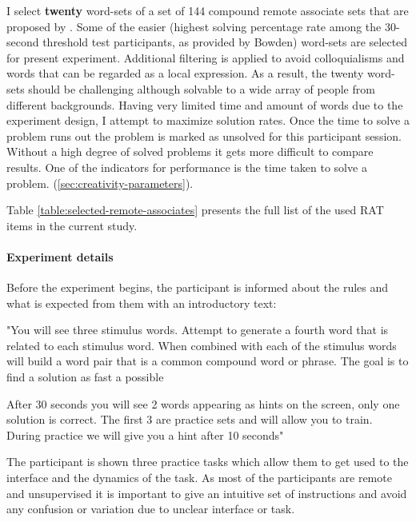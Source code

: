 		
 		I select \textbf{twenty} word-sets of a set of 144 compound remote associate sets that are proposed by \cite{Bowden}. Some of the easier (highest solving percentage rate among the 30-second threshold test participants, as provided by Bowden) word-sets are selected for present experiment. Additional filtering is applied to avoid colloquialisms and words that can be regarded as a local expression. As a result, the twenty word-sets should be challenging although solvable to a wide array of people from different backgrounds. Having very limited time and amount of words due to the experiment design, I attempt to maximize solution rates. Once the time to solve a problem runs out the problem is marked as unsolved for this participant session. Without a high degree of solved problems it gets more difficult to compare results.
		One of the indicators for performance is the time taken to solve a problem. (\ref{sec:creativity-parameters}).
 		
 		Table \ref{table:selected-remote-associates} presents the full list of the used RAT items in the current study. 
		
		\paragraph{Experiment details}
		
		Before the experiment begins, the participant is informed about the rules and what is expected from them with an introductory text:
		
		\begin{displayquote}
			"You will see three stimulus words. Attempt to generate a fourth word that is related to each stimulus word. When combined with each of the stimulus words will build a word pair that is a common compound word or phrase. The goal is to find a solution as fast a possible
			
			After 30 seconds you will see 2 words appearing as hints on the screen, only one solution is correct.
			The first 3 are practice sets and will allow you to train. During practice we will give you a hint after 10 seconds"
		\end{displayquote}
	
		The participant is shown three practice tasks which allow them to get used to the interface and the dynamics of the task. As most of the participants are remote and unsupervised it is important to give an intuitive set of instructions and avoid any confusion or variation due to unclear interface or task.
		
